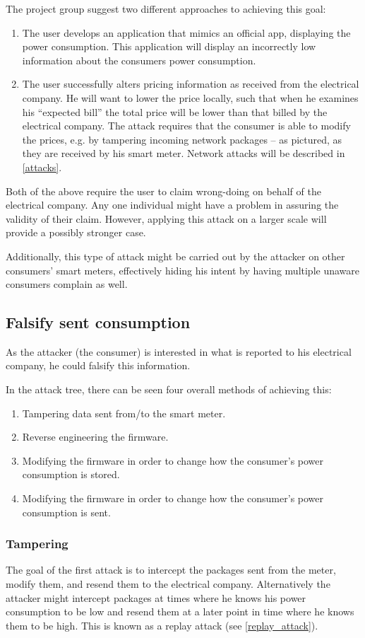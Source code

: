 The project group suggest two different approaches to achieving this goal:
\begin{enumerate}
  \item The user develops an application that mimics an official app, displaying the power consumption.
  This application will display an incorrectly low information about the consumers power consumption.
  \item The user successfully alters pricing information as received from the electrical company.
  He will want to lower the price locally, such that when he examines his ``expected bill'' the total price will be lower than that billed by the electrical company.
  The attack requires that the consumer is able to modify the prices, e.g. by tampering incoming network packages -- as pictured, as they are received by his smart meter.
  Network attacks will be described in \cref{attacks}.
\end{enumerate}
Both of the above require the user to claim wrong-doing on behalf of the electrical company.
Any one individual might have a problem in assuring the validity of their claim.
However, applying this attack on a larger scale will provide a possibly stronger case.

Additionally, this type of attack might be carried out by the attacker on other consumers' smart meters, effectively hiding his intent by having multiple unaware consumers complain as well.

\subsection{Falsify sent consumption}
As the attacker (the consumer) is interested in what is reported to his electrical company, he could falsify this information.

In the attack tree, there can be seen four overall methods of achieving this:
\begin{enumerate}
  \item Tampering data sent from/to the smart meter.
  \item Reverse engineering the firmware.
  \item Modifying the firmware in order to change how the consumer's power consumption is stored.
  \item Modifying the firmware in order to change how the consumer's power consumption is sent.
\end{enumerate}

\subsubsection{Tampering}
The goal of the first attack is to intercept the packages sent from the meter, modify them, and resend them to the electrical company.
Alternatively the attacker might intercept packages at times where he knows his power consumption to be low and resend them at a later point in time where he knows them to be high.
This is known as a replay attack (see \cref{replay_attack}).

